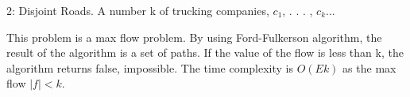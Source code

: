 \begin{problem}{2: Disjoint Roads.} A number k of trucking companies, $c_1$, . . . , $c_k$...
\end{problem}
\begin{sol}
This problem is a max flow problem. By using Ford-Fulkerson algorithm, the result of the algorithm is a set of paths. If the value of the flow is less than k, the algorithm returns false, impossible. The time complexity is $O(Ek)$ as the max flow $|f|<k$.
\end{sol}